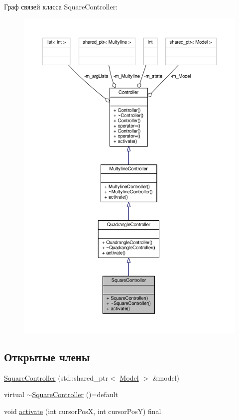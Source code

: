 Граф связей класса Square\-Controller\-:
\nopagebreak
\begin{figure}[H]
\begin{center}
\leavevmode
\includegraphics[width=350pt]{class_square_controller__coll__graph}
\end{center}
\end{figure}
\subsection*{Открытые члены}
\begin{DoxyCompactItemize}
\item 
\hyperlink{class_square_controller_a64d29b2a5ba3fc6dfe1d9402d32e552a}{Square\-Controller} (std\-::shared\-\_\-ptr$<$ \hyperlink{class_model}{Model} $>$ \&model)
\item 
virtual \hyperlink{class_square_controller_aaac778e973aa3419f0a3dacaed16bdc5}{$\sim$\-Square\-Controller} ()=default
\item 
void \hyperlink{class_square_controller_a169d59d75dd023ed352e7722a3bd2dcc}{activate} (int cursor\-Pos\-X, int cursor\-Pos\-Y) final
\end{DoxyCompactItemize}



